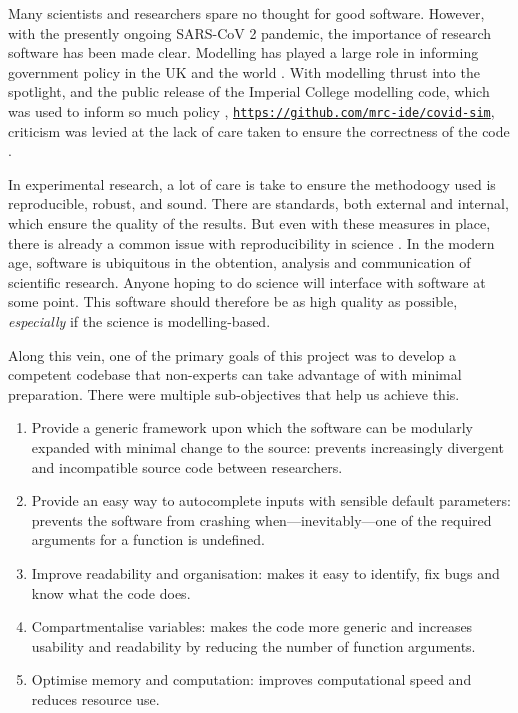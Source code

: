 Many scientists and researchers spare no thought for good software. However, with the presently ongoing SARS-CoV 2 pandemic, the importance of research software has been made clear. Modelling has played a large role in informing government policy in the UK and the world \cite{covidScotland,covidUK1,covidUK2}. With modelling thrust into the spotlight, and the public release of the Imperial College modelling code, which was used to inform so much policy \cite{covidUK2}, \href{https://github.com/mrc-ide/covid-sim}{\texttt{https://github.com/mrc-ide/covid-sim}}, criticism was levied at the lack of care taken to ensure the correctness of the code \cite{natureModelCritique}.

In experimental research, a lot of care is take to ensure the methodoogy used is reproducible, robust, and sound. There are standards, both external and internal, which ensure the quality of the results. But even with these measures in place, there is already a common issue with reproducibility in science \cite{mede2020replication,randall2018irreproducibility,bolli2015reflections}. In the modern age, software is ubiquitous in the obtention, analysis and communication of scientific research. Anyone hoping to do science will interface with software at some point. This software should therefore be as high quality as possible, \emph{especially} if the science is modelling-based.

Along this vein, one of the primary goals of this project was to develop a competent codebase that non-experts can take advantage of with minimal preparation. There were multiple sub-objectives that help us achieve this.
\begin{enumerate}
  \item Provide a generic framework upon which the software can be modularly expanded with minimal change to the source: prevents increasingly divergent and incompatible source code between researchers.
  \item Provide an easy way to autocomplete inputs with sensible default parameters: prevents the software from crashing when---inevitably---one of the required arguments for a function is undefined.
  \item Improve readability and organisation: makes it easy to identify, fix bugs and know what the code does.
  \item Compartmentalise variables: makes the code more generic and increases usability and readability by reducing the number of function arguments.
  \item Optimise memory and computation: improves computational speed and reduces resource use.
\end{enumerate}

